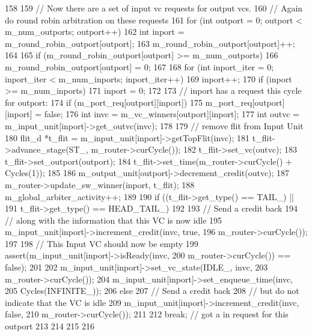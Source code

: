 \begin{DoxyCode}
158 {
159     // Now there are a set of input vc requests for output vcs.
160     // Again do round robin arbitration on these requests
161     for (int outport = 0; outport < m_num_outports; outport++) {
162         int inport = m_round_robin_outport[outport];
163         m_round_robin_outport[outport]++;
164 
165         if (m_round_robin_outport[outport] >= m_num_outports)
166             m_round_robin_outport[outport] = 0;
167 
168         for (int inport_iter = 0; inport_iter < m_num_inports; inport_iter++) {
169             inport++;
170             if (inport >= m_num_inports)
171                 inport = 0;
172 
173             // inport has a request this cycle for outport:
174             if (m_port_req[outport][inport]) {
175                 m_port_req[outport][inport] = false;
176                 int invc = m_vc_winners[outport][inport];
177                 int outvc = m_input_unit[inport]->get_outvc(invc);
178 
179                 // remove flit from Input Unit
180                 flit_d *t_flit = m_input_unit[inport]->getTopFlit(invc);
181                 t_flit->advance_stage(ST_, m_router->curCycle());
182                 t_flit->set_vc(outvc);
183                 t_flit->set_outport(outport);
184                 t_flit->set_time(m_router->curCycle() + Cycles(1));
185 
186                 m_output_unit[outport]->decrement_credit(outvc);
187                 m_router->update_sw_winner(inport, t_flit);
188                 m_global_arbiter_activity++;
189 
190                 if ((t_flit->get_type() == TAIL_) ||
191                     t_flit->get_type() == HEAD_TAIL_) {
192 
193                     // Send a credit back
194                     // along with the information that this VC is now idle
195                     m_input_unit[inport]->increment_credit(invc, true,
196                         m_router->curCycle());
197 
198                     // This Input VC should now be empty
199                     assert(m_input_unit[inport]->isReady(invc,
200                         m_router->curCycle()) == false);
201 
202                     m_input_unit[inport]->set_vc_state(IDLE_, invc,
203                         m_router->curCycle());
204                     m_input_unit[inport]->set_enqueue_time(invc,
205                         Cycles(INFINITE_));
206                 } else {
207                     // Send a credit back
208                     // but do not indicate that the VC is idle
209                     m_input_unit[inport]->increment_credit(invc, false,
210                         m_router->curCycle());
211                 }
212                 break; // got a in request for this outport
213             }
214         }
215     }
216 }
\end{DoxyCode}
